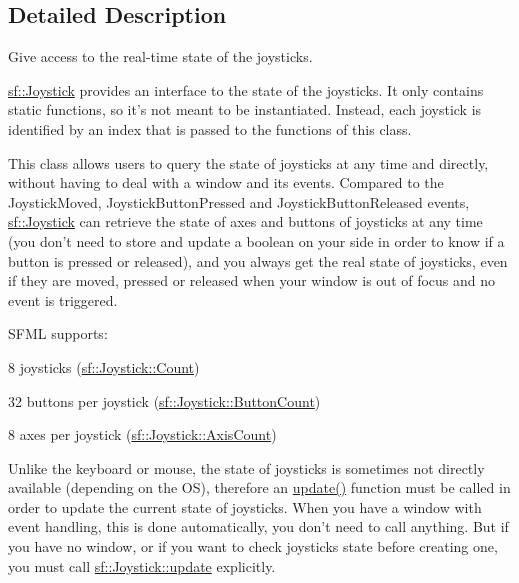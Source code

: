 \subsection{Detailed Description}
Give access to the real-\/time state of the joysticks. 

\hyperlink{classsf_1_1_joystick}{sf\-::\-Joystick} provides an interface to the state of the joysticks. It only contains static functions, so it's not meant to be instantiated. Instead, each joystick is identified by an index that is passed to the functions of this class.

This class allows users to query the state of joysticks at any time and directly, without having to deal with a window and its events. Compared to the Joystick\-Moved, Joystick\-Button\-Pressed and Joystick\-Button\-Released events, \hyperlink{classsf_1_1_joystick}{sf\-::\-Joystick} can retrieve the state of axes and buttons of joysticks at any time (you don't need to store and update a boolean on your side in order to know if a button is pressed or released), and you always get the real state of joysticks, even if they are moved, pressed or released when your window is out of focus and no event is triggered.

S\-F\-M\-L supports\-: \begin{DoxyItemize}
\item 8 joysticks (\hyperlink{classsf_1_1_joystick_aa49548ab614125923944b5d340f67a77a58bb2e8f3749310d61097e4361bc0ba8}{sf\-::\-Joystick\-::\-Count}) \item 32 buttons per joystick (\hyperlink{classsf_1_1_joystick_aa49548ab614125923944b5d340f67a77a34b2a9c61551a32ea6f60004963c7252}{sf\-::\-Joystick\-::\-Button\-Count}) \item 8 axes per joystick (\hyperlink{classsf_1_1_joystick_aa49548ab614125923944b5d340f67a77a09f1cd81cc403e481e06a7cf15a18877}{sf\-::\-Joystick\-::\-Axis\-Count})\end{DoxyItemize}
Unlike the keyboard or mouse, the state of joysticks is sometimes not directly available (depending on the O\-S), therefore an \hyperlink{classsf_1_1_joystick_ab85fa9175b4edd3e5a07ee3cde0b0f48}{update()} function must be called in order to update the current state of joysticks. When you have a window with event handling, this is done automatically, you don't need to call anything. But if you have no window, or if you want to check joysticks state before creating one, you must call \hyperlink{classsf_1_1_joystick_ab85fa9175b4edd3e5a07ee3cde0b0f48}{sf\-::\-Joystick\-::update} explicitly.

